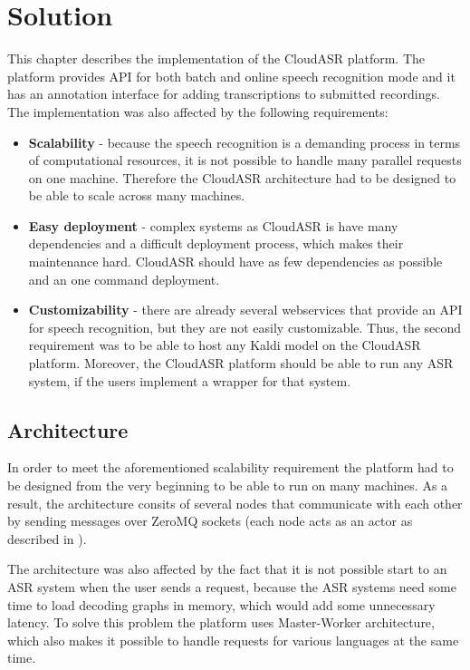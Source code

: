 \chapter{Solution}
This chapter describes the implementation of the CloudASR platform.
The platform provides API for both batch and online speech recognition mode
  and it has an annotation interface for adding transcriptions to submitted recordings.
The implementation was also affected by the following requirements:

\begin{itemize}
  \item
    \textbf{Scalability} -
      because the speech recognition is a demanding process in terms of computational resources,
        it is not possible to handle many parallel requests on one machine.
      Therefore the CloudASR architecture had to be designed to be able to scale across many machines.

  \item
    \textbf{Easy deployment} -
      complex systems as CloudASR is have many dependencies and a difficult deployment process,
        which makes their maintenance hard.
      CloudASR should have as few dependencies as possible and an one command deployment.

  \item
    \textbf{Customizability} -
       there are already several webservices that provide an API for speech recognition,
         but they are not easily customizable.
       Thus, the second requirement was to be able to host any Kaldi model on  the CloudASR platform.
       Moreover, the CloudASR platform should be able to run any ASR system,
         if the users implement a wrapper for that system.

\end{itemize}


\section{Architecture}
In order to meet the aforementioned scalability requirement
  the platform had to be designed from the very beginning to be able to run on many machines.
As a result, the architecture consits of several nodes
  that communicate with each other by sending messages over ZeroMQ sockets
  (each node acts as an actor as described in \cite{hewitt1977viewing}).

The architecture was also affected by the fact
  that it is not possible start to an ASR system when the user sends a request,
  because the ASR systems need some time to load decoding graphs in memory,
  which would add some unnecessary latency.
To solve this problem the platform uses Master-Worker architecture,
  which also makes it possible to handle requests for various languages at the same time.


